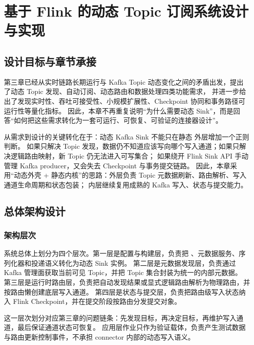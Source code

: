 
\chapter{基于 Flink 的动态 Topic 订阅系统设计与实现}

\section{设计目标与章节承接}

第三章已经从实时链路长期运行与 Kafka Topic 动态变化之间的矛盾出发，提出了动态 Topic 发现、自动订阅、动态路由和数据处理四类功能需求，
并进一步给出了发现实时性、吞吐可接受性、小规模扩展性、Checkpoint 协同和事务路径可运行性等量化指标。
因此，本章不再重复说明“为什么需要动态 Sink”，而是回答“如何把这些需求转化为一套可运行、可恢复、可验证的连接器设计”。

从需求到设计的关键转化在于：动态 Kafka Sink 不能只在静态  外层增加一个正则判断。
如果只解决 Topic 发现，数据仍不知道应该写向哪个写入通道；如果只解决逻辑路由映射，新 Topic 仍无法进入可写集合；
如果绕开 Flink Sink API 手动管理 Kafka producer，又会失去 Checkpoint 与事务提交链路。
因此，本章采用“动态外壳 + 静态内核”的思路：外层负责 Topic 元数据刷新、路由解析、写入通道生命周期和状态包装；
内层继续复用成熟的 Kafka 写入、状态与提交能力。

\section{总体架构设计}

\subsection{架构层次}

系统总体上划分为四个层次。第一层是配置与构建层，负责把 、元数据服务、序列化器和投递语义转化为动态 Sink 实例。
第二层是元数据发现层，负责通过 Kafka 管理面获取当前可见 Topic，并把 Topic 集合封装为统一的内部元数据。
第三层是运行时路由层，负责把自动发现结果或显式逻辑路由解析为物理路由，并按路由懒创建底层写入通道。
第四层是状态与提交层，负责把路由级写入状态纳入 Flink Checkpoint，并在提交阶段按路由分发提交对象。

这一层次划分对应第三章的问题链条：先发现目标，再决定目标，再维护写入通道，最后保证通道状态可恢复。
应用层作业只作为验证载体，负责产生测试数据与路由更新控制事件，不承担 connector 内部的动态写入语义。

